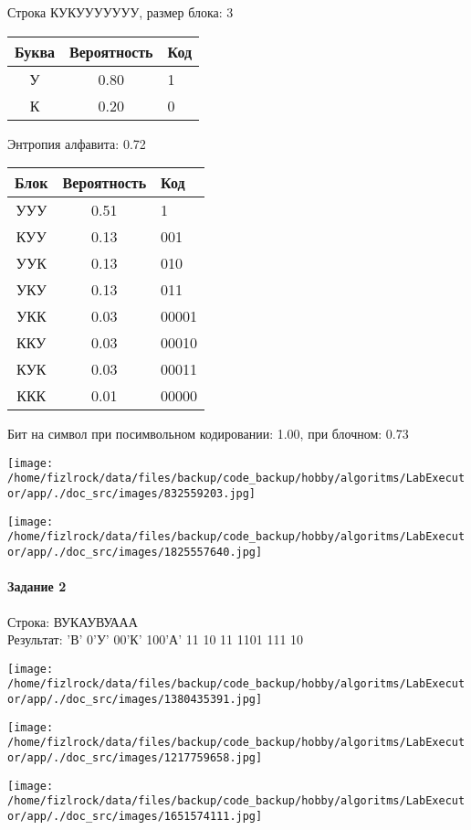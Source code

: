 \documentclass[a4paper, 12pt]{article}
\begin{document}
Строка КУКУУУУУУУ, размер блока: 3
\begin{center}
 \begin{tabular}{ |c|c|l| } 
  \hline
     Буква & Вероятность & Код\\ \hline
У & 0.80 & 1\\\hline
К & 0.20 & 0
\\ \hline \end{tabular}
\end{center}
Энтропия алфавита: 0.72
\begin{center}
 \begin{tabular}{ |c|c|l| } 
  \hline
     Блок & Вероятность & Код\\ \hline
УУУ & 0.51 & 1\\\hline
КУУ & 0.13 & 001\\\hline
УУК & 0.13 & 010\\\hline
УКУ & 0.13 & 011\\\hline
УКК & 0.03 & 00001\\\hline
ККУ & 0.03 & 00010\\\hline
КУК & 0.03 & 00011\\\hline
ККК & 0.01 & 00000
\\ \hline \end{tabular}
\end{center}
Бит на символ при посимвольном кодировании: 1.00, при блочном: 0.73

\texttt{[image: /home/fizlrock/data/files/backup/code\_backup/hobby/algoritms/LabExecutor/app/./doc\_src/images/832559203.jpg]}

\texttt{[image: /home/fizlrock/data/files/backup/code\_backup/hobby/algoritms/LabExecutor/app/./doc\_src/images/1825557640.jpg]}
\pagebreak
\paragraph{Задание 2}

Строка: 
ВУКАУВУААА\\
Результат: 'В' 0'У' 00'К' 100'А' 11 10 11 1101 111 10

\texttt{[image: /home/fizlrock/data/files/backup/code\_backup/hobby/algoritms/LabExecutor/app/./doc\_src/images/1380435391.jpg]}

\texttt{[image: /home/fizlrock/data/files/backup/code\_backup/hobby/algoritms/LabExecutor/app/./doc\_src/images/1217759658.jpg]}

\texttt{[image: /home/fizlrock/data/files/backup/code\_backup/hobby/algoritms/LabExecutor/app/./doc\_src/images/1651574111.jpg]}
\end{document}
